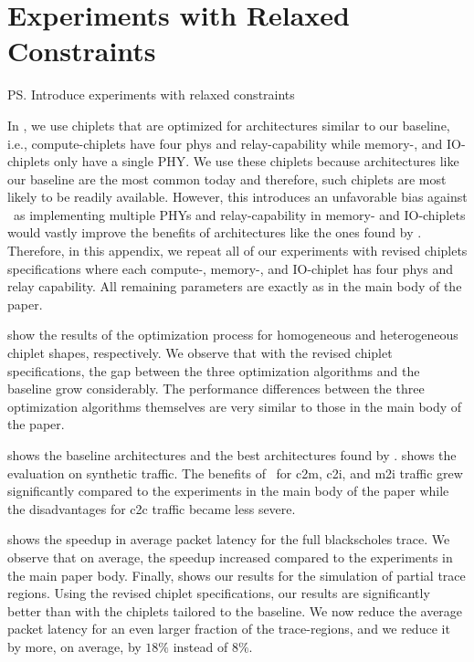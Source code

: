 \section{Experiments with Relaxed Constraints}
\label{app:relaxed-constraints}

\ps{Introduce experiments with relaxed constraints}

In , we use chiplets that are optimized for architectures similar to our baseline, i.e., compute-chiplets have four \gls{phys} and relay-capability while memory-, and IO-chiplets only have a single PHY.
We use these chiplets because architectures like our baseline are the most common today and therefore, such chiplets are most likely to be readily available.
However, this introduces an unfavorable bias against \name~as implementing multiple PHYs and relay-capability in memory- and IO-chiplets would vastly improve the benefits of architectures like the ones found by \name.
Therefore, in this appendix, we repeat all of our experiments with revised chiplets specifications where each compute-, memory-, and IO-chiplet has four \gls{phys} and relay capability.
All remaining parameters are exactly as in the main body of the paper.













\newpage
{} show the results of the optimization process for homogeneous and heterogeneous chiplet shapes, respectively.
We observe that with the revised chiplet specifications, the gap between the three optimization algorithms and the baseline grow considerably. 
The performance differences between the three optimization algorithms themselves are very similar to those in the main body of the paper.


 shows the baseline architectures and the best architectures found by \name.
 shows the evaluation on synthetic traffic. 
The benefits of \name~for \gls{c2m}, \gls{c2i}, and \gls{m2i} traffic grew significantly compared to the experiments in the main body of the paper while the disadvantages for \gls{c2c} traffic became less severe.

 shows the speedup in average packet latency for the full blackscholes trace. 
We observe that on average, the speedup increased compared to the experiments in the main paper body.
Finally,  shows our results for the simulation of partial trace regions.
Using the revised chiplet specifications, our results are significantly better than with the chiplets tailored to the baseline.
We now reduce the average packet latency for an even larger fraction of the trace-regions, and we reduce it by more, on average, by $18\%$ instead of $8\%$.




